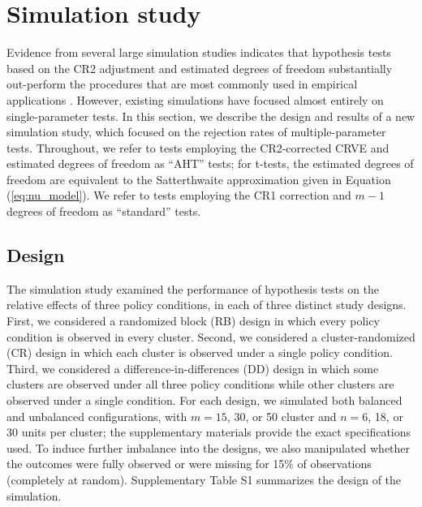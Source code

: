 \documentclass[12pt]{article}\usepackage[]{graphicx}\usepackage[]{color}
\begin{document}
\section{Simulation study}
\label{sec:simulation}

Evidence from several large simulation studies indicates that hypothesis tests based on the CR2 adjustment and estimated degrees of freedom substantially out-perform the procedures that are most commonly used in empirical applications \citep[][]{Cameron2015practitioners, Imbens2015robust,Bell2002bias}.
However, existing simulations have focused almost entirely on single-parameter tests. 
In this section, we describe the design and results of a new simulation study, which focused on the rejection rates of multiple-parameter tests.
Throughout, we refer to tests employing the CR2-corrected CRVE and estimated degrees of freedom as ``AHT'' tests; for t-tests, the estimated degrees of freedom are equivalent to the Satterthwaite approximation given in Equation (\ref{eq:nu_model}). 
We refer to tests employing the CR1 correction and $m - 1$ degrees of freedom as ``standard'' tests. 

\subsection{Design}

The simulation study examined the performance of hypothesis tests on the relative effects of three policy conditions, in each of three distinct study designs. 
First, we considered a randomized block (RB) design in which every policy condition is observed in every cluster. 
Second, we considered a cluster-randomized (CR) design in which each cluster is observed under a single policy condition. 
Third, we considered a difference-in-differences (DD) design in which some clusters are observed under all three policy conditions while other clusters are observed under a single condition. 
For each design, we simulated both balanced and unbalanced configurations, with $m = 15$, 30, or 50 cluster and $n = 6$, 18, or 30 units per cluster; 
the supplementary materials provide the exact specifications used. To induce further imbalance into the designs, we also manipulated whether the outcomes were fully observed or were missing for 15\% of observations (completely at random). Supplementary Table S1 summarizes the design of the simulation.
\end{document}

